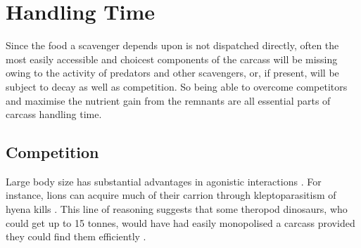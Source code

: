 \documentclass[a4paper,12pt]{article}
\begin{document}







\section*{Handling Time}
Since the food a scavenger depends upon is not dispatched directly, often the most easily accessible and choicest components of the carcass will be missing owing to the activity of predators and other scavengers, or, if present, will be subject to decay as well as competition.
So being able to overcome competitors and maximise the nutrient gain from the remnants are all essential parts of carcass handling time. 

\subsection*{Competition}
Large body size has substantial advantages in agonistic interactions \citep{ruxton2004obligate}. 
For instance, lions can acquire much of their carrion through kleptoparasitism of hyena kills \citep{trinkel2005competitive}. 
This line of reasoning suggests that some theropod dinosaurs, who could get up to 15 tonnes, would have had easily monopolised a carcass \citep{weishampel2004dinosauria} provided they could find them efficiently \citep{kane2016body}. 
\end{document}
